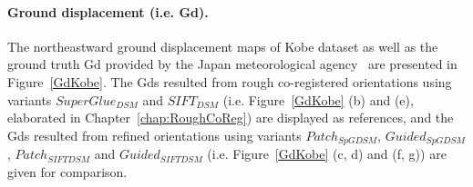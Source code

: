 \paragraph{Ground displacement (i.e. Gd).}
The northeastward ground displacement %
maps of Kobe dataset as well as the ground truth Gd provided by the Japan meteorological agency~\cite{ian1996morphological} are presented in Figure~\ref{GdKobe}. 
The Gds resulted from rough co-registered orientations using variants $SuperGlue_{DSM}$ and $SIFT_{DSM}$ (i.e. Figure~\ref{GdKobe} (b) and (e), elaborated in Chapter~\ref{chap:RoughCoReg}) are displayed as references, and the Gds resulted from refined orientations using variants $Patch_{SpGDSM}$, $Guided_{SpGDSM}$, $Patch_{SIFTDSM}$ and $Guided_{SIFTDSM}$ (i.e. Figure~\ref{GdKobe} (c, d) and (f, g)) are given for comparison. 

